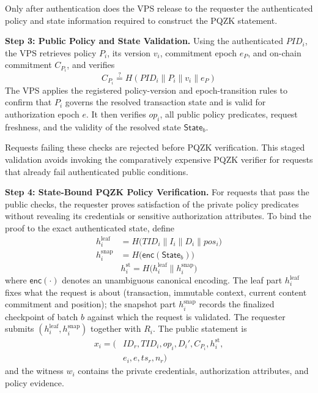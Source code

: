 \documentclass[lettersize,journal]{IEEEtran}
\begin{document}
Only after authentication does the VPS release to the requester the
authenticated policy and state information required to construct the
PQZK statement.

\medskip
\noindent\textbf{Step 3: Public Policy and State Validation.}
Using the authenticated $PID_i$, the VPS retrieves policy $P_i$, its
version $v_i$, commitment epoch $e_P$, and on-chain commitment
$C_{P_i}$, and verifies
\begin{equation}
C_{P_i}
\stackrel{?}{=}
H(PID_i\parallel P_i\parallel v_i\parallel e_P)
\end{equation}
The VPS applies the registered policy-version and epoch-transition rules
to confirm that $P_i$ governs the resolved transaction state and is
valid for authorization epoch $e$. It then verifies $op_i$, all public
policy predicates, request freshness, and the validity of the resolved
state $\mathsf{State}_b$.

Requests failing these checks are rejected before PQZK verification.
This staged validation avoids invoking the comparatively expensive
PQZK verifier for requests that already fail authenticated public
conditions.

\medskip
\noindent\textbf{Step 4: State-Bound PQZK Policy Verification.}
For requests that pass the public checks, the requester proves
satisfaction of the private policy predicates without revealing its
credentials or sensitive authorization attributes. To bind the proof
to the exact authenticated state, define
\begin{equation}
\begin{aligned}
h_i^{\mathrm{leaf}} &= H\big(TID_i\parallel I_i\parallel D_i\parallel pos_i\big)\\
h_i^{\mathrm{snap}} &= H\big(\mathsf{enc}(\mathsf{State}_b)\big)
\end{aligned}
\label{eq:hleaf_hsnap}
\end{equation}
\begin{equation}
h_i^{\mathrm{st}}
=
H\big(h_i^{\mathrm{leaf}}\parallel h_i^{\mathrm{snap}}\big)
\end{equation}
where $\mathsf{enc}(\cdot)$ denotes an unambiguous canonical encoding.
The leaf part $h_i^{\mathrm{leaf}}$ fixes what the request
is about (transaction, immutable context, current content commitment and
position); the snapshot part $h_i^{\mathrm{snap}}$ records the finalized
checkpoint of batch $b$ against which the request is validated. The
requester submits $(h_i^{\mathrm{leaf}},h_i^{\mathrm{snap}})$ together
with $R_i$.
The public statement is
\begin{equation}
\begin{aligned}
x_i=\big(&ID_r,TID_i,op_i,D_i',
C_{P_i},h_i^{\mathrm{st}},\\
& e_i,e,ts_r,n_r\big)
\end{aligned}
\label{eq:pqzk_stmt}
\end{equation}
and the witness $w_i$ contains the private credentials,
authorization attributes, and policy evidence.
\end{document}
